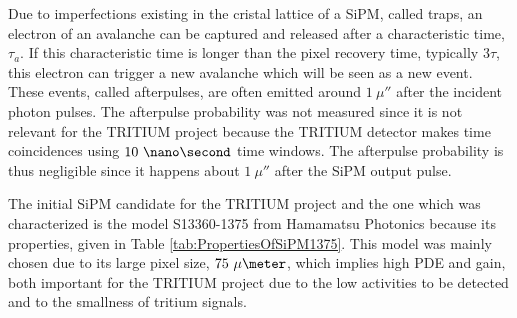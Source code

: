 
Due to imperfections existing in the cristal lattice of a SiPM, called traps, an electron of an avalanche can be captured and released after a characteristic time, $\tau_a$. If this characteristic time is longer than the pixel recovery time, typically $3\tau$, this electron can trigger a new avalanche which will be seen as a new event. These events, called  afterpulses, are often emitted around $1~\mu\second$ after the incident photon pulses. The afterpulse probability was not measured since it is not relevant for the TRITIUM project because the TRITIUM detector makes time coincidences using $10~\nano\second$ time windows. The afterpulse probability is thus negligible since it happens about $1~\mu\second$ after the SiPM output pulse.

The initial SiPM candidate for the TRITIUM project and the one which was characterized is the model S13360-1375 from Hamamatsu Photonics \cite{DataSheetHammamatsu_1_SiPM_1375} because its properties, given in Table \ref{tab:PropertiesOfSiPM1375}. This model was mainly chosen due to its large pixel size, $75~\mu\meter$, which implies high PDE and gain, both important for the TRITIUM project due to the low activities to be detected and to the smallness of tritium signals. %

